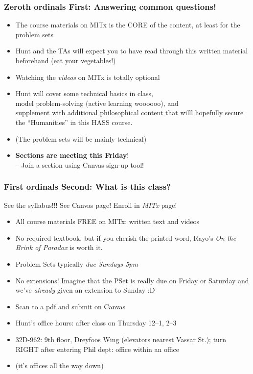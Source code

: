 \begin{frame}
  \frametitle{Zeroth ordinals First: Answering common questions!}
    
    \begin{itemize}[<+->] 
    \item The course materials on MITx is the CORE of the content, at least for the problem sets
    \item Hunt and the TAs will expect you to have read through this written material beforehand (eat your vegetables!)
    \item Watching the \textit{videos} on MITx is totally optional 
    \item Hunt will cover some technical basics in class, \\ model problem-solving (active learning woooooo), and \\ supplement with additional philosophical content that willl hopefully secure the ``Humanities'' in this HASS course. 
\item (The problem sets will be mainly technical)
\item \textbf{Sections are meeting this Friday}! \\ -- Join a section using Canvas sign-up tool!
    
  \end{itemize}
  
   \end{frame}

\begin{frame}
  \frametitle{First ordinals Second: What is this class?}
  
  See the syllabus!!! See Canvas page! Enroll in \emph{MITx} page!
  
    \begin{itemize}[<+->] 
\item All course materials FREE on MITx: written text and videos 
        \item No required textbook, but if you cherish the printed word, Rayo's \textit{On the Brink of Paradox} is worth it.
    \item Problem Sets typically \emph{due Sundays 5pm}
    \item No extensions! Imagine that the PSet is really due on Friday or Saturday and we've \textit{already} given an extension to Sunday :D
   \item Scan to a pdf and submit on Canvas
   \item Hunt's office hours: after class on Thursday 12--1, 2--3
    \item 32D-962: 9th floor, Dreyfoos Wing (elevators nearest Vassar St.); turn RIGHT after entering Phil dept: office within an office 
\item[] (it's offices all the way down)
    
  \end{itemize}

  
  \end{frame}

